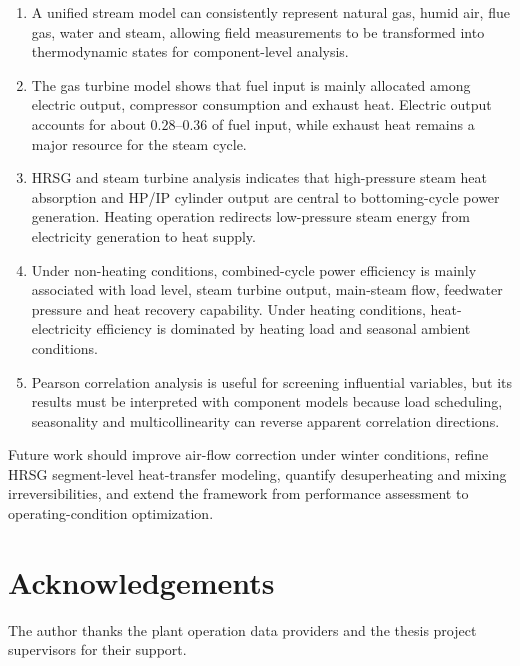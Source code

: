 \documentclass[12pt,a4paper]{article}
\begin{document}
\begin{enumerate}
  \item A unified stream model can consistently represent natural gas, humid air, flue gas, water and steam, allowing field measurements to be transformed into thermodynamic states for component-level analysis.
  \item The gas turbine model shows that fuel input is mainly allocated among electric output, compressor consumption and exhaust heat. Electric output accounts for about \(0.28\)--\(0.36\) of fuel input, while exhaust heat remains a major resource for the steam cycle.
  \item HRSG and steam turbine analysis indicates that high-pressure steam heat absorption and HP/IP cylinder output are central to bottoming-cycle power generation. Heating operation redirects low-pressure steam energy from electricity generation to heat supply.
  \item Under non-heating conditions, combined-cycle power efficiency is mainly associated with load level, steam turbine output, main-steam flow, feedwater pressure and heat recovery capability. Under heating conditions, heat-electricity efficiency is dominated by heating load and seasonal ambient conditions.
  \item Pearson correlation analysis is useful for screening influential variables, but its results must be interpreted with component models because load scheduling, seasonality and multicollinearity can reverse apparent correlation directions.
\end{enumerate}

Future work should improve air-flow correction under winter conditions, refine HRSG segment-level heat-transfer modeling, quantify desuperheating and mixing irreversibilities, and extend the framework from performance assessment to operating-condition optimization.

\section*{Acknowledgements}
The author thanks the plant operation data providers and the thesis project supervisors for their support.
\end{document}
